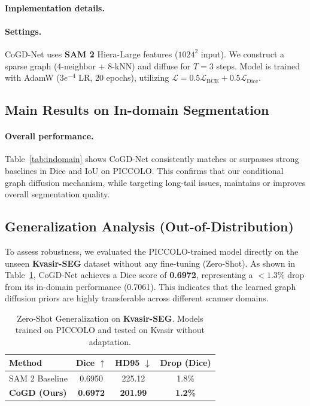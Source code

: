 \documentclass{article}
\begin{document}
\paragraph{Implementation details.}
\paragraph{Settings.} CoGD-Net uses \textbf{SAM 2} Hiera-Large features ($1024^2$ input). We construct a sparse graph (4-neighbor + 8-kNN) and diffuse for $T=3$ steps. Model is trained with AdamW ($3e^{-4}$ LR, 20 epochs), utilizing $\mathcal{L} = 0.5 \mathcal{L}_{\mathrm{BCE}} + 0.5 \mathcal{L}_{\mathrm{Dice}}$.

\subsection{Main Results on In-domain Segmentation}

\paragraph{Overall performance.}
Table~\ref{tab:indomain} shows CoGD-Net consistently matches or surpasses strong baselines in Dice and IoU on PICCOLO. This confirms that our conditional graph diffusion mechanism, while targeting long-tail issues, maintains or improves overall segmentation quality.

\subsection{Generalization Analysis (Out-of-Distribution)}
To assess robustness, we evaluated the PICCOLO-trained model directly on the unseen \textbf{Kvasir-SEG} dataset without any fine-tuning (Zero-Shot).
As shown in Table~\ref{tab:generalization}, CoGD-Net achieves a Dice score of \textbf{0.6972}, representing a \textbf{$<1.3\%$} drop from its in-domain performance (0.7061). This indicates that the learned graph diffusion priors are highly transferable across different scanner domains.

\begin{table}[t]
\centering
\small
\caption{Zero-Shot Generalization on \textbf{Kvasir-SEG}. Models trained on PICCOLO and tested on Kvasir without adaptation.}
\label{tab:generalization}
\begin{tabular}{lccc}
\toprule
Method & Dice $\uparrow$ & HD95 $\downarrow$ & Drop (Dice) \\
\midrule
SAM 2 Baseline & 0.6950 & 225.12 & 1.8\% \\
\textbf{CoGD (Ours)} & \textbf{0.6972} & \textbf{201.99} & \textbf{1.2\%} \\
\bottomrule
\end{tabular}
\end{table}
\end{document}
